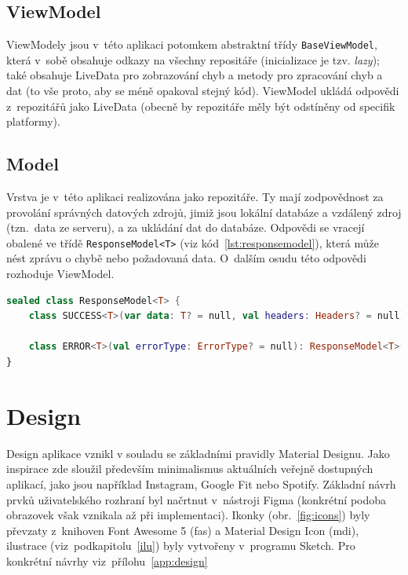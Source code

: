 \documentclass[twoside]{ctuthesis}
\begin{document}
\subsection{ViewModel}

ViewModely jsou v~této aplikaci potomkem abstraktní třídy \texttt{BaseViewModel}, která v~sobě obsahuje odkazy na všechny repositáře (inicializace je tzv. \textit{lazy}); také obsahuje LiveData pro zobrazování chyb a metody pro zpracování chyb a dat (to vše proto, aby se méně opakoval stejný kód). ViewModel ukládá odpovědi z~repozitářů jako LiveData (obecně by repozitáře měly být odstíněny od specifik platformy).

\subsection{Model}

Vrstva je v~této aplikaci realizována jako repozitáře. Ty mají zodpovědnost za provolání správných datových zdrojů, jimiž jsou lokální databáze a vzdálený zdroj (tzn.~data ze serveru), a za ukládání dat do databáze. Odpovědi se vracejí obalené ve třídě \texttt{ResponseModel<T>} (viz kód~\ref{lst:responsemodel}), která může nést zprávu o chybě nebo požadovaná data. O~dalším osudu této odpovědi rozhoduje ViewModel.

\begin{lstlisting}[language=Kotlin,caption={Třída \texttt{ResponseModel}},label={lst:responsemodel}]
sealed class ResponseModel<T> {
	class SUCCESS<T>(var data: T? = null, val headers: Headers? = null): ResponseModel<T>()

	class ERROR<T>(val errorType: ErrorType? = null): ResponseModel<T>()
}
\end{lstlisting}

\section{Design}\label{design}

Design aplikace vznikl v souladu se základními pravidly Material Designu. Jako inspirace zde sloužil především minimalismus aktuálních veřejně dos\-tup\-ných aplikací, jako jsou například Instagram, Google Fit nebo Spotify. Základní návrh prvků uživatelského rozhraní byl načrtnut v~nástroji Figma (konkrétní podoba obrazovek však vznikala až při implementaci). Ikonky (obr.~\ref{fig:icons}) byly převzaty z~knihoven Font Awesome 5 (fas) a Material Design Icon (mdi), ilustrace (viz~podkapitolu~\ref{ilu}) byly vytvořeny v~programu Sketch. Pro konkrétní návrhy viz~přílohu~\ref{app:design}
\end{document}
